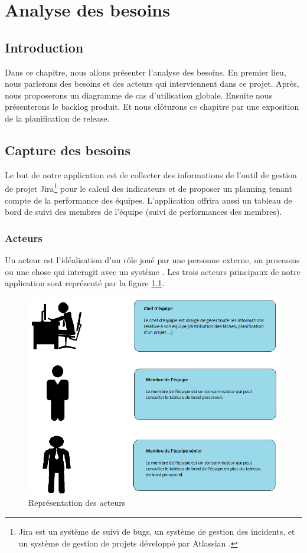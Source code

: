 \chapter{Analyse des besoins}
\section{Introduction}
Dans ce chapitre, nous allons présenter l'analyse des besoins. En premier lieu, nous parlerons des besoins et des acteurs qui interviennent dans ce projet. Après, nous proposerons un diagramme de cas d'utilisation globale. Ensuite nous présenterons le backlog produit. Et nous clôturons ce chapitre par une exposition de la planification de release.
\section{Capture des besoins}
Le but de notre application est de collecter des informations de l’outil de gestion
de projet Jira\footnote{Jira est un système de suivi de bugs, un système de gestion des incidents, et un système de gestion de projets développé par Atlassian \cite{Jira}.} pour le calcul des indicateurs et de proposer un planning tenant compte de la performance des
équipes. L’application offrira aussi un tableau de bord de suivi des membres de l'équipe (suivi de
performances des membres).
\subsection{Acteurs}
Un acteur est l'idéalisation d'un rôle joué par une personne externe, un processus ou une chose qui interagit avec un système \cite {Acteur}. Les trois acteurs principaux de notre application sont représenté par la figure \ref{code6}.
\begin{figure}[H]
  \centering
  \includegraphics[scale=0.7]{figures/actors.png}
  \caption{Représentation des acteurs}
  \label{code6}
\end{figure}
